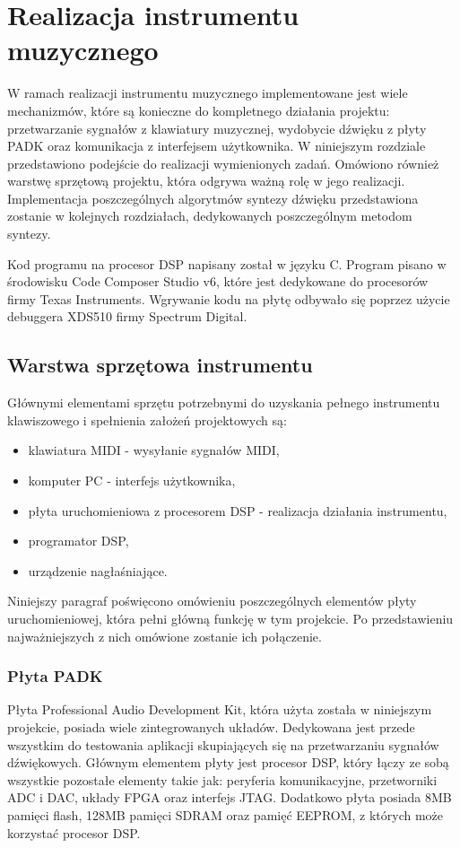 \chapter{Realizacja instrumentu muzycznego}
W ramach realizacji instrumentu muzycznego implementowane jest wiele mechanizmów, które są konieczne do kompletnego działania projektu: przetwarzanie sygnałów z klawiatury muzycznej, wydobycie dźwięku z płyty PADK oraz komunikacja z interfejsem użytkownika. W niniejszym rozdziale przedstawiono podejście do realizacji wymienionych zadań. Omówiono również warstwę sprzętową projektu, która odgrywa ważną rolę w jego realizacji. Implementacja poszczególnych algorytmów syntezy dźwięku przedstawiona zostanie w kolejnych rozdziałach, dedykowanych poszczególnym metodom syntezy.

Kod programu na procesor DSP napisany został w języku C. Program pisano w środowisku Code Composer Studio v6, które jest dedykowane do procesorów firmy Texas Instruments. Wgrywanie kodu na płytę odbywało się poprzez użycie debuggera XDS510 firmy Spectrum Digital.


\section{Warstwa sprzętowa instrumentu}
Głównymi elementami sprzętu potrzebnymi do uzyskania pełnego instrumentu klawiszowego i spełnienia założeń projektowych są:
\begin{itemize}
	\item klawiatura MIDI - wysyłanie sygnałów MIDI,
	\item komputer PC - interfejs użytkownika,
	\item płyta uruchomieniowa z procesorem DSP - realizacja działania instrumentu,
	\item programator DSP,
	\item urządzenie nagłaśniające.
\end{itemize}

Niniejszy paragraf poświęcono omówieniu poszczególnych elementów płyty uruchomieniowej, która pełni główną funkcję w tym projekcie. Po przedstawieniu najważniejszych z nich omówione zostanie ich połączenie.

\subsection{Płyta PADK}
Płyta Professional Audio Development Kit, która użyta została w niniejszym projekcie, posiada wiele zintegrowanych układów. Dedykowana jest przede wszystkim do testowania aplikacji skupiających się na przetwarzaniu sygnałów dźwiękowych. Głównym elementem płyty jest procesor DSP, który łączy ze sobą wszystkie pozostałe elementy takie jak: peryferia komunikacyjne, przetworniki ADC i DAC, układy FPGA oraz interfejs JTAG. Dodatkowo płyta posiada 8MB pamięci flash, 128MB pamięci SDRAM oraz pamięć EEPROM, z których może korzystać procesor DSP.

